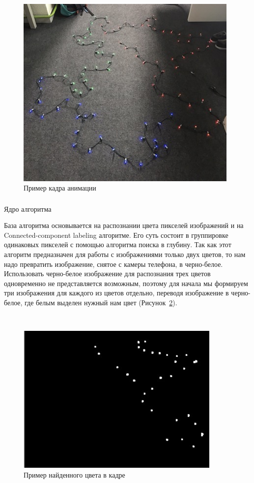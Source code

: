 ~
\begin{figure}[H]
\centering
	\includegraphics[scale=0.8]{figures/calibration_animation.jpg}
	\caption{Пример кадра анимации}
	\label{fig:develop:algorithm:animation}
\end{figure}

\subsubsection{} Ядро алгоритма
\label{sec:develop:algorithm:core}

База алгоритма основывается на распознании цвета пикселей изображений и на Connected-component labeling алгоритме. Его суть состоит в группировке одинаковых пикселей с помощью алгоритма поиска в глубину. Так как этот алгоритм предназначен для работы с изображениями только двух цветов, то нам надо превратить изображение, снятое с камеры телефона, в черно-белое. Использовать черно-белое изображение для распознания трех цветов одновременно не представляется возможным, поэтому для начала мы формируем три изображения для каждого из цветов отдельно, переводя изображение в черно-белое, где белым выделен нужный нам цвет (Рисунок~\ref{fig:develop:algorithm:colorFinding}).

~
\begin{figure}[H]
\centering
	\includegraphics[scale=0.8]{figures/calibration_findedColor.jpg}
	\caption{Пример найденного цвета в кадре}
	\label{fig:develop:algorithm:colorFinding}
\end{figure}

